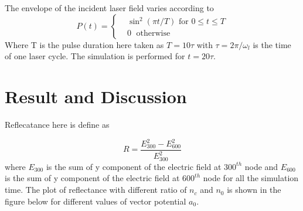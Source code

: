 \documentclass[12pt]{article}
\newenvironment{changemargin}[2]{%
\begin{list}{}{%
\setlength{\topsep}{0pt}%
\setlength{\leftmargin}{#1}%
\setlength{\rightmargin}{#2}%
\setlength{\listparindent}{\parindent}%
\setlength{\itemindent}{\parindent}%
\setlength{\parsep}{\parskip}%
}%
\item[]}{\end{list}}
\begin{document}
\begin{changemargin}{-3cm}{-3cm}
    The envelope of the incident laser field varies according to
    \begin{equation}\label{envelope}
        P(t)=
        \begin{cases}
             & \sin^2(\pi t/T) \text{ for } 0 \leq t \le T \\
             & 0         \;      \text{ otherwise }
        \end{cases}
    \end{equation}
    Where T is the pulse duration here taken as $T=10\tau$ with $\tau = 2\pi/\omega_l$ is the time of one laser cycle. The simulation is performed for $t=20\tau$.
    \section{Result and Discussion}
    Reflecatance here is define as

    \begin{equation}\label{reflectance}
        R
        = \frac{{E_{300}^2}-{E_{600}^2}}{{E_{300}^2}}
    \end{equation}
    where $E_{300}$ is the sum of y component of the electric field at $300^{th}$ node and $E_{600}$ is the sum of y component of the electric field at $600^{th}$ node for all the simulation time. The plot of reflectance with different ratio of $n_c$ and $n_0$ is shown in the figure below for different values of vector potential $a_0$.


\end{changemargin}
\end{document}
